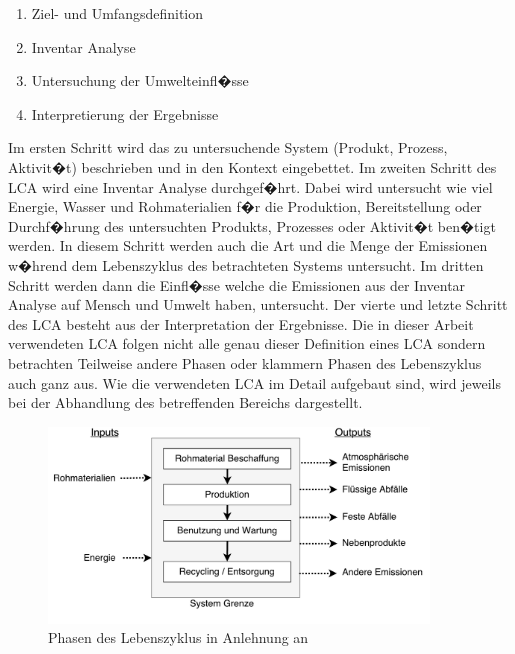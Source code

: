 \documentclass[a4paper,twoside,10pt]{report}
\begin{document}
\begin{enumerate}
	\item Ziel- und Umfangsdefinition
	\item Inventar Analyse
	\item Untersuchung der Umwelteinfl�sse
	\item Interpretierung der Ergebnisse
\end{enumerate}

Im ersten Schritt wird das zu untersuchende System (Produkt, Prozess, Aktivit�t) beschrieben und in den Kontext eingebettet. Im zweiten Schritt des \ac{LCA} wird eine Inventar Analyse durchgef�hrt. Dabei wird untersucht wie viel Energie, Wasser und Rohmaterialien f�r die Produktion, Bereitstellung oder Durchf�hrung des untersuchten Produkts, Prozesses oder Aktivit�t ben�tigt werden. In diesem Schritt werden auch die Art und die Menge der Emissionen w�hrend dem Lebenszyklus des betrachteten Systems untersucht. Im dritten Schritt werden dann die Einfl�sse welche die Emissionen aus der Inventar Analyse auf Mensch und Umwelt haben, untersucht. Der vierte und letzte Schritt des \ac{LCA} besteht aus der Interpretation der Ergebnisse. Die in dieser Arbeit verwendeten \ac{LCA} folgen nicht alle genau dieser Definition eines \ac{LCA} sondern betrachten Teilweise andere Phasen oder klammern Phasen des Lebenszyklus auch ganz aus. Wie die verwendeten \ac{LCA} im Detail aufgebaut sind, wird jeweils bei der Abhandlung des betreffenden Bereichs dargestellt. \cite{lca}

\begin{figure}[htb]%
\includegraphics[width=0.9\textwidth]{LCA.pdf}%
\caption{Phasen des Lebenszyklus in Anlehnung an \cite{lca}}%
\label{img:LCA}%
\end{figure}
 
\end{document}
